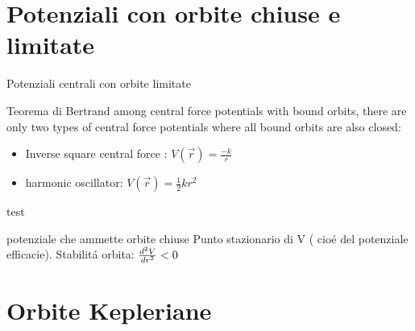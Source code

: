 \section{Potenziali con orbite chiuse e limitate}
\begin{frame}{Potenziali centrali con orbite limitate}
\begin{block}{Teorema di Bertrand}
among central force potentials with bound orbits, there are only two types of central force potentials where all bound orbits are also closed:
\begin{itemize}
\item Inverse square central force : $V(\vec{r})=\frac{-k}{r}$
\item harmonic oscillator: $V(\vec{r})=\frac{1}{2}kr^2$
\end{itemize}
\end{block}
\end{frame}

test

\begin{wordonframe}{potenziale che ammette orbite chiuse}
Punto stazionario di V ( cio\'e del potenziale efficacie).
Stabilit\'a orbita: $\TtwoDy{r}{V}<0$
\end{wordonframe}

\section{Orbite Kepleriane}

